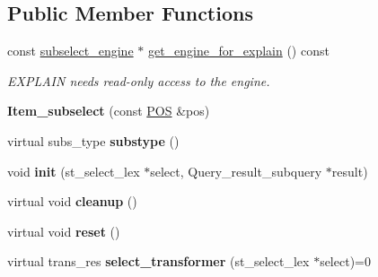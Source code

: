 \subsection*{Public Member Functions}
\begin{DoxyCompactItemize}
\item 
\mbox{\label{classItem__subselect_a4e4cfad55d29b325f1943a53dd329037}} 
const \mbox{\hyperlink{classsubselect__engine}{subselect\+\_\+engine}} $\ast$ \mbox{\hyperlink{classItem__subselect_a4e4cfad55d29b325f1943a53dd329037}{get\+\_\+engine\+\_\+for\+\_\+explain}} () const
\begin{DoxyCompactList}\small\item\em E\+X\+P\+L\+A\+IN needs read-\/only access to the engine. \end{DoxyCompactList}\item 
\mbox{\label{classItem__subselect_afd257a4ceeaf579a71ce317f5a8d384b}} 
{\bfseries Item\+\_\+subselect} (const \mbox{\hyperlink{structYYLTYPE}{P\+OS}} \&pos)
\item 
\mbox{\label{classItem__subselect_a8c1f983b699962ed0959c9b66562acce}} 
virtual subs\+\_\+type {\bfseries substype} ()
\item 
\mbox{\label{classItem__subselect_a9468be7092a2cd16d62b9944696b2bdb}} 
void {\bfseries init} (st\+\_\+select\+\_\+lex $\ast$select, Query\+\_\+result\+\_\+subquery $\ast$result)
\item 
\mbox{\label{classItem__subselect_a8e56b0bedaa5c944bbe5a85f410931e6}} 
virtual void {\bfseries cleanup} ()
\item 
\mbox{\label{classItem__subselect_a6ebf42152773e7024635d16c473f4edc}} 
virtual void {\bfseries reset} ()
\item 
\mbox{\label{classItem__subselect_a580567b9ee7d9ddf00df6f6d69deb669}} 
virtual trans\+\_\+res {\bfseries select\+\_\+transformer} (st\+\_\+select\+\_\+lex $\ast$select)=0
\item 
\mbox{\label{classItem__subselect_a809b0e63113f553e7c5c65cee97f2087}} 

\end{DoxyCompactItemize}
